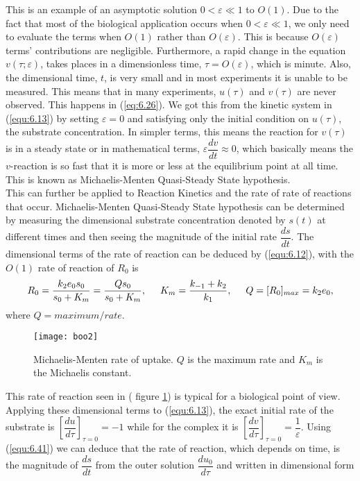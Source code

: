 \documentclass[a4paper]{report}
\theoremstyle{definition}
\begin{document}
This is an example of an asymptotic solution $0<\varepsilon\ll1$ to $O(1)$.
Due to the fact that most of the biological application occurs when $0<\varepsilon\ll1$, we only need to evaluate the terms when $O(1)$ rather than $O(\varepsilon)$. This is because $O(\varepsilon)$ terms' contributions are negligible.
Furthermore, a rapid change in the equation $v(\tau;\varepsilon)$, takes places in a dimensionless time, $\tau=O(\varepsilon)$, which is minute. Also, the dimensional time, $t$, is very small and in most experiments it is unable to be measured. This means that in many experiments, $u(\tau)$ and $v(\tau)$ are never observed. This happens in (\ref{eq:6.26}). We got this from the kinetic system in (\ref{equ:6.13}) by setting ${\varepsilon=0}$ and satisfying only the initial condition on $u(\tau)$, the substrate concentration. In simpler terms, this means the reaction for $v(\tau)$ is in a steady state or in mathematical terms, $\varepsilon \dfrac{dv}{dt}\approx 0$, which basically means the $v$-reaction is so fast that it is more or less at the equilibrium point at all time. This is known as Michaelis-Menten Quasi-Steady State hypothesis.\\
This can further be applied to Reaction Kinetics and the rate of rate of reactions that occur. Michaelis-Menten Quasi-Steady State hypothesis can be determined  by measuring the dimensional substrate concentration denoted by $s(t)$ at different times and then seeing the magnitude of the initial rate $\dfrac{ds}{dt}$. The dimensional terms of the rate of reaction can be deduced by (\ref{equ:6.12}), with the $O(1)$ rate of reaction of $R_0$ is 
\begin{align}\label{equ:6.41}
R_0=\dfrac{k_2e_0s_0}{s_0+K_m}=\dfrac{Qs_0}{s_0+K_m},\hspace{5mm}K_m=\dfrac{k_{-1} +k_2}{k_1},\hspace{5mm}Q=[R_0]_{max} =k_2e_0,
\end{align}
where $Q=maximum/rate$.
\begin{figure}[H]
 \texttt{[image: boo2]}
  \caption{Michaelis-Menten rate of uptake. $Q$ is the maximum rate and $K_m$ is the Michaelis constant.}
  \label{figure1b}
\end{figure}
This rate of reaction seen in ( figure \ref{figure1b}) is typical for a biological point of view. Applying these dimensional terms to (\ref{equ:6.13}), the exact initial rate of the substrate is $\left[\dfrac{du}{d\tau}\right]_{\tau=0} =-1$ while for the complex it is $\left[\dfrac{dv}{d\tau}\right]_{\tau=0} =\dfrac{1}{\varepsilon}$. Using (\ref{equ:6.41}) we can deduce that the rate of reaction, which depends on time, is the magnitude of $\dfrac{ds}{dt}$ from the outer solution $\dfrac{du_0}{d\tau}$ and written in dimensional form
\end{document}
